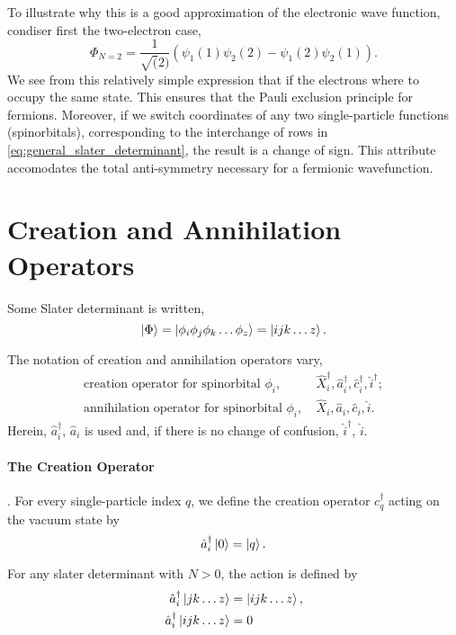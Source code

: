 To illustrate why this is a good approximation of the electronic wave function,
condiser first the two-electron case,
\begin{equation}
    \Phi_{N=2} = \frac{1}{\sqrt(2)}(\psi_1(1)\psi_2(2) - \psi_1(2)\psi_2(1)).
\end{equation}
We see from this relatively simple expression that if the electrons where to occupy
the same state. This ensures that the Pauli exclusion principle for 
fermions\cite{pauli1925zusammenhang}. Moreover, if we switch coordinates of any two 
single-particle functions (spinorbitals), corresponding to the interchange of rows in
\autoref{eq:general_slater_determinant}, the result is a change of sign. This attribute
accomodates the total anti-symmetry necessary for a fermionic wavefunction.       

\section{Creation and Annihilation Operators}
   
    Some Slater determinant is written,
    \begin{equation}
        \ket{\Phi} = \ket{\phi_i \phi_j \phi_k \dots \phi_z} = \ket{ijk \dots z}.
    \end{equation}

    The notation of creation and annihilation operators vary,
    \begin{align*}
        \text{creation operator for spinorbital } \phi_i, &\ 
        \hat{X}_i^\dagger, \hat{a}^\dagger_i, \hat{c}_i^\dagger, \hat{i}^\dagger; \\
        \text{annihilation operator for spinorbital } \phi_i, &\ 
        \hat{X}_i, \hat{a}_i, \hat{c}_i, \hat{i}.       
    \end{align*}
    Herein, $\hat{a}_i^\dagger$, $\hat{a}_i$ is used and, if there is no change of 
    confusion, $\hat{i}^\dagger$, $\hat{i}$.

    \paragraph{The Creation Operator}. For every single-particle index $q$,
    we define the creation operator
    $c_q^\dagger$ acting on the vacuum state by
    \begin{equation}
        \hat{a}_i^\dagger \ket{0} = \ket{q}.
    \end{equation}

    For any slater determinant with $N > 0$, the action is defined by
    \begin{align}
        \hat{a}_i^\dagger\ket{jk \dots z} &= \ket{ijk \dots z}, \\
        \hat{a}_i^\dagger\ket{ijk \dots z} &= 0
    \end{align}

